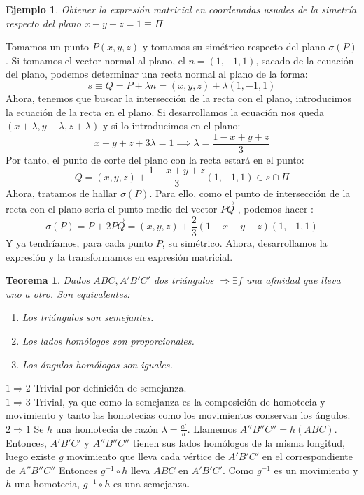 \documentclass[11pt, a4paper]{article}
\makeatletter
\newif\IfInSansMode
\let\oldsf\sffamily
\renewcommand*{\sffamily}{\oldsf\mathversion{sans}\InSansModetrue}
\let\oldnorm\normalfont
\renewcommand*{\normalfont}{\oldnorm\InSansModefalse\mathversion{normal}}
\renewenvironment{proof}[1][\proofname] {\vspace{-15pt}\par\pushQED{\qed}\normalfont\topsep6\p@\@plus6\p@\relax\trivlist\item[\hskip\labelsep\it#1\@addpunct{.}]\ignorespaces}{\popQED\endtrivlist\@endpefalse}
\renewcommand{\vec}{\overrightarrow}
\renewenvironment{proof}[1][\proofname] {\par\pushQED{\qed}\normalfont\topsep6\p@\@plus6\p@\relax\trivlist\item[\hskip\labelsep\itshape\sffamily#1\@addpunct{.}]\ignorespaces}{\popQED\endtrivlist\@endpefalse}
\theoremstyle{theorem-style}
\newtheorem{nth}{Teorema}[section]
\theoremstyle{definition-style}
\theoremstyle{remark-style}
\theoremstyle{example-style}
\newtheorem{ejemplo}{Ejemplo}[section]
\makeatother
\begin{document}
\begin{ejemplo}
  Obtener la expresión matricial en coordenadas usuales de la simetría respecto del plano $x-y+z = 1\equiv \Pi$
\end{ejemplo}
\begin{proof}[Solución:]
  Tomamos un punto $P(x,y,z)$ y tomamos su simétrico respecto del plano $\sigma(P)$. Si tomamos el vector normal al plano, el $n=(1,-1,1)$, sacado de la ecuación del plano, podemos determinar una recta normal al plano de la forma:
  \[
    s\equiv Q = P + \lambda n = (x,y,z)+\lambda(1,-1,1)
  \]
  Ahora, tenemos que buscar la intersección de la recta con el plano, introducimos la ecuación de la recta en el plano. Si desarrollamos la ecuación nos queda $(x+\lambda,y-\lambda,z+\lambda)$ y si lo introducimos en el plano:
  \[
    x-y+z+3\lambda = 1 \implies \lambda = \frac{1-x+y+z}{3}
  \]
  Por tanto, el punto de corte del plano con la recta estará en el punto:
  \[
    Q = (x,y,z)+\frac{1-x+y+z}{3}(1,-1,1) \in s\cap \Pi
  \]
  Ahora, tratamos de hallar $\sigma(P)$. Para ello, como el punto de intersección de la recta con el plano sería el punto medio del vector $\vec{PQ}$ , podemos hacer :
  \[
    \sigma(P) = P + 2 \vec{PQ} = (x,y,z) + \dfrac{2}{3}(1-x+y+z)(1,-1,1)
  \]
  Y ya tendríamos, para cada punto $P$, su simétrico. Ahora, desarrollamos la expresión y la transformamos en expresión matricial.
\end{proof}

\begin{nth}
  Dados $ABC, A'B'C'$ dos triángulos $\Rightarrow \exists f$ una afinidad que lleva uno a otro. Son equivalentes:
  \begin{enumerate}
  \item Los triángulos son semejantes.
  \item Los lados homólogos son proporcionales.
  \item Los ángulos homólogos son iguales.
  \end{enumerate}	
\end{nth}

\begin{proof} \hfill 

  $\boxed{1 \Rightarrow 2}$ Trivial por definición de semejanza.\\
  $\boxed{1 \Rightarrow 3}$ Trivial, ya que como la semejanza es la composición de homotecia y movimiento y tanto las homotecias como los movimientos conservan los ángulos.\\
  $\boxed{2 \Rightarrow 1}$ Se $h$ una homotecia de razón $\lambda = \frac{a'}{a}$. Llamemos $A''B''C'' = h(ABC)$. Entonces, $A'B'C'$ y $A''B''C''$ tienen sus lados homólogos de la misma longitud, luego existe $g$ movimiento que lleva cada vértice de $A'B'C'$ en el correspondiente de $A''B''C''$ Entonces $g^{-1} \circ h$ lleva $ABC$ en $	A'B'C'$. Como $g^{-1}$ es un movimiento y $h$ una homotecia, $g^{-1} \circ h$ es una semejanza.
\end{proof}
\end{document}
